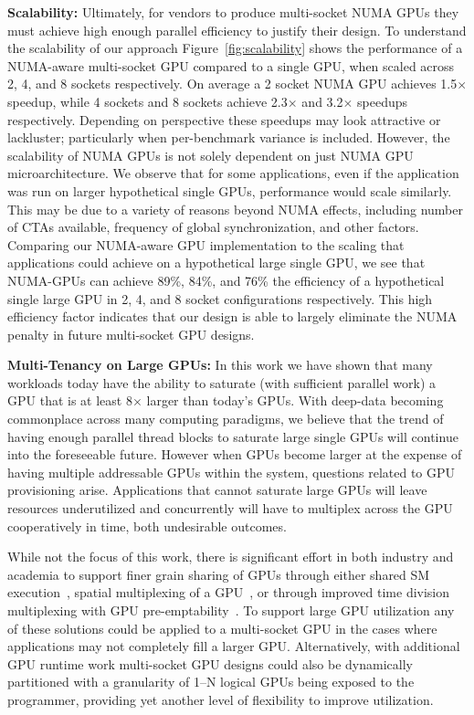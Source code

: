 \textbf{Scalability:} Ultimately, for vendors to produce multi-socket NUMA 
GPUs they must achieve high enough parallel efficiency to justify their design.  To 
understand the scalability of our approach Figure~\ref{fig:scalability} 
shows the performance of a NUMA-aware multi-socket GPU compared to a single 
GPU, when scaled across 2, 4, and 8 sockets respectively.  On average a 2 
socket NUMA GPU achieves 1.5$\times$ speedup, while 4 sockets and 8 sockets achieve 
2.3$\times$ and 3.2$\times$ speedups respectively.  Depending on perspective 
these 
speedups may look attractive or lackluster; particularly when per-benchmark 
variance is included.  However, the scalability of NUMA GPUs is not solely 
dependent on just NUMA GPU microarchitecture. We observe that for some 
applications, even if the application was run on larger hypothetical 
single GPUs, performance would scale similarly.  This may be due to a variety of 
reasons beyond NUMA effects, including number of CTAs available, frequency of 
global synchronization, and other factors.  Comparing our NUMA-aware GPU 
implementation to the scaling that applications could achieve on a hypothetical
large single GPU, we see that NUMA-GPUs can achieve 89\%, 84\%, and 76\% the
efficiency of a hypothetical single large GPU in 2, 4, and 8 socket configurations respectively.  
This high efficiency factor indicates that our design is able to largely eliminate
the NUMA penalty in future multi-socket GPU designs.

\textbf{Multi-Tenancy on Large GPUs:} In this work we have shown that many 
workloads today have the ability to saturate (with sufficient parallel work) 
a GPU that is at least 8$\times$ larger than today's GPUs.  With deep-data 
becoming commonplace across many computing paradigms, we believe that the 
trend of having enough parallel thread blocks to saturate large single GPUs will 
continue into the foreseeable future. However when GPUs become larger at the 
expense of having multiple addressable GPUs within the system, questions related 
to GPU provisioning arise.  Applications that cannot saturate large GPUs will 
leave resources underutilized and concurrently will have to multiplex across
the GPU cooperatively in time, both undesirable outcomes.

While not the focus of this work, there is significant effort in both 
industry and academia to support finer grain sharing of GPUs through either 
shared SM execution~\cite{tanasic2014enabling}, spatial multiplexing of a 
GPU~\cite{park2015chimera}, or through improved time division multiplexing 
with GPU pre-emptability~\cite{lin2016enabling}.  To support large GPU 
utilization any of these solutions could be applied to a multi-socket GPU in 
the cases where applications may not completely fill a larger GPU.  
Alternatively, with additional GPU runtime work multi-socket GPU 
designs could also be dynamically partitioned with a granularity of 
1--N logical GPUs being exposed to the programmer, providing yet another level 
of flexibility to improve utilization.

